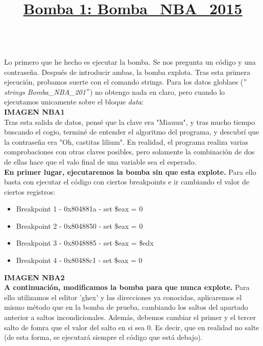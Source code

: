 \documentclass[11pt,a4paper]{article}
\begin{document}

\title{\large{\textbf{\underline{Bomba 1: Bomba\_NBA\_2015}}}} \\

Lo primero que he hecho es ejecutar la bomba. Se nos pregunta un código y una contraseña. Después de introducir ambas, la bomba explota. Tras esta primera ejecución, probamos suerte con el comando strings. Para los datos globlaes (\emph{$"$strings Bomba\_NBA\_201$"$}) no obtengo nada en claro, pero cuando lo ejecutamos unicamente sobre el bloque \emph{data}: \\

\textbf{IMAGEN NBA1} \\

Tras esta salida de datos, pensé que la clave era "Miauuu", y tras mucho tiempo buscando el cogio, terminé de entender el algoritmo del programa, y descubrí que la contraseña era "Oh, castitas lilium". En realidad, el programa realiza varias comprobaciones con otras claves posibles, pero solamente la combinación de dos de ellas hace que el valo final de una variable sea el esperado. \\

\textbf{En primer lugar, ejecutaremos la bomba sin que esta explote.} Para ello basta con ejecutar el código con ciertos breakpoints e ir cambiando el valor de ciertos registros:

\begin{itemize}
	\item Breakpoint 1 - 0x804881a - set \$eax = 0
	\item Breakpoint 2 - 0x8048850 - set \$eax = 0
	\item Breakpoint 3 - 0x8048885 - set \$eax = \$edx
	\item Breakpoint 4 - 0x80488c1 - set \$eax = 0
\end{itemize}

\textbf{IMAGEN NBA2} \\

\textbf{A continuación, modificamos la bomba para que nunca explote.}  Para ello utilizamos el editor 'ghex' y las direcciones ya conocidas, aplicaremos el mismo método que en la bomba de prueba, cambiando los saltos del apartado anterior a saltos incondicionales. Además, debemos cambiar el primer y el tercer salto de fomra que el valor del salto en si sea 0. Es decir, que en realidad no salte (de esta forma, se ejecutará siempre el código que está debajo). \\
\end{document}
